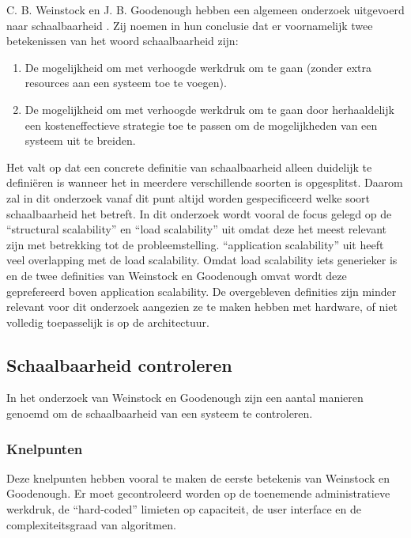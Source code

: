 C. B. Weinstock en J. B. Goodenough hebben een algemeen onderzoek uitgevoerd naar schaalbaarheid \parencite{OnSystemScalability}. Zij noemen in hun conclusie dat er voornamelijk twee betekenissen van het woord schaalbaarheid zijn:
\begin{enumerate}
	\item De mogelijkheid om met verhoogde werkdruk om te gaan (zonder extra resources aan een systeem toe te voegen).
	\item De mogelijkheid om met verhoogde werkdruk om te gaan door herhaaldelijk een kosteneffectieve strategie toe te passen om de mogelijkheden van een systeem uit te breiden.
\end{enumerate}
Het valt op dat een concrete definitie van schaalbaarheid alleen duidelijk te definiëren is wanneer het in meerdere verschillende soorten is opgesplitst. Daarom zal in dit onderzoek vanaf dit punt altijd worden gespecificeerd welke soort schaalbaarheid het betreft. In dit onderzoek wordt vooral de focus gelegd op de \enquote{structural scalability} en \enquote{load scalability} uit \parencite{ScalabilityCharacteristics} omdat deze het meest relevant zijn met betrekking tot de probleemstelling. \enquote{application scalability} uit \parencite{AdvancedArchitecture} heeft veel overlapping met de load scalability. Omdat load scalability iets generieker is en de twee definities van Weinstock en Goodenough \parencite{OnSystemScalability} omvat wordt deze geprefereerd boven application scalability. De overgebleven definities zijn minder relevant voor dit onderzoek aangezien ze te maken hebben met hardware, of niet volledig toepasselijk is op de architectuur.

\subsection{Schaalbaarheid controleren}
In het onderzoek van Weinstock en Goodenough \parencite{OnSystemScalability} zijn een aantal manieren genoemd om de schaalbaarheid van een systeem te controleren.

\subsubsection{Knelpunten}
Deze knelpunten hebben vooral te maken de eerste betekenis van Weinstock en Goodenough. Er moet gecontroleerd worden op de toenemende administratieve werkdruk, de \enquote{hard-coded} limieten op capaciteit, de user interface en de complexiteitsgraad van algoritmen.

